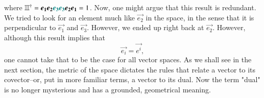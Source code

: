 where $\mathbb{I} \mathbb{I}^\dagger = \vec{e_1} \vec{e_2} \color{teal} \vec{e_3} \vec{e_3} \color{black} \vec{e_2} \vec{e_1} = 1$. Now, one might argue that this result is redundant. We tried to look for an element much like $\vec{e_2}$ in the space, in the sense that it is perpendicular to $\vec{e_1}$ and $\vec{e_3}$. However, we ended up right back at $\vec{e_2}$. However, although this result implies that 
\begin{equation*}
    \vec{e_i} = \vec{e^i},
\end{equation*} 
one cannot take that to be the case for all vector spaces. As we shall see in the next section, the metric of the space dictates the rules that relate a vector to its covector--or, put in more familiar terms, a vector to its dual. Now the term "dual" is no longer mysterious and has a grounded, geometrical meaning.
